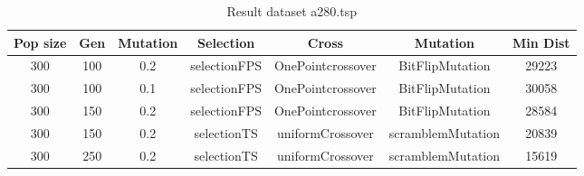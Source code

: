 \documentclass[12pt]{report}
\begin{document}
    \begin{table}
        \centering
        \begin{tabular}{|c|c|c|c|c|c|c|}
            \hline
            Pop size & Gen & Mutation & Selection & Cross & Mutation & Min Dist\\
            \hline
            300 & 100 & 0.2 & selectionFPS & OnePointcrossover & BitFlipMutation & 29223 \\
            \hline
            300 & 100 & 0.1 & selectionFPS & OnePointcrossover & BitFlipMutation & 30058 \\
            \hline
            300 & 150 & 0.2 & selectionFPS & OnePointcrossover & BitFlipMutation & 28584 \\
            \hline
            300 & 150 & 0.2 & selectionTS & uniformCrossover & scramblemMutation & 20839 \\
            \hline
            300 & 250 & 0.2 & selectionTS & uniformCrossover & scramblemMutation & 15619 \\
            \hline
            \end{tabular}
        \caption{Result dataset a280.tsp}
        \label{resultsa280}
    \end{table}
\end{document}
